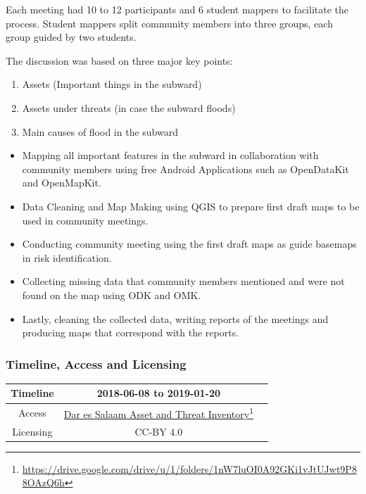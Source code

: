 \documentclass[a4paper,12pt,twoside]{article}
\begin{document}
Each meeting had 10 to 12 participants and 6 student mappers to facilitate the process. Student mappers split community members into three groups, each group guided by two students.

The discussion was based on three major key points:
\begin{enumerate}
    \item Assets (Important things in the subward)
    \item Assets under threats (in case the subward floods)
    \item Main causes of flood in the subward
\end{enumerate}

\medskip

\begin{itemize}
    \item Mapping all important features in the subward in collaboration with community members using free Android Applications such as OpenDataKit and OpenMapKit.
    \item Data Cleaning and Map Making using QGIS to prepare first draft maps to be used in community meetings.
    \item Conducting community meeting using the first draft maps as guide basemaps in risk identification.
    \item Collecting missing data that community members mentioned and were not found on the map using ODK and OMK.
    \item Lastly, cleaning the collected data, writing reports of the meetings and producing maps that correspond with the reports.
\end{itemize}

\subsubsection{Timeline, Access and Licensing}
\begin{center}
\begin{tabular}{|c|c|c|}  
 \hline
  Timeline  &   2018-06-08 to 2019-01-20 \\
\hline  
 Access  & 
    \href{https://drive.google.com/drive/u/1/folders/1nW7luOI0A92GKi1vJtUJwt9P88OAzQ6h}{Dar es Salaam Asset and Threat Inventory}\footnote{\url{https://drive.google.com/drive/u/1/folders/1nW7luOI0A92GKi1vJtUJwt9P88OAzQ6h}} \\
   
\hline 
    Licensing & CC-BY 4.0 \\
\hline
\end{tabular}
\end{center}
\end{document}
